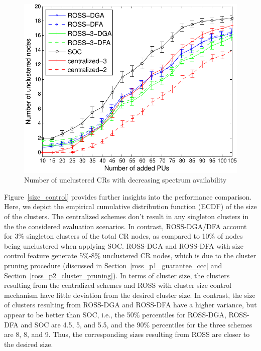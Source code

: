 \documentclass[times]{ettauth}
\theoremstyle{mytheoremstyle}
\theoremstyle{mytheoremstyle}
\theoremstyle{mytheoremstyle}
\begin{document}
\begin{figure}[th]
\begin{multicols}{3}
    \includegraphics[width=\linewidth]{survival_rate_20.pdf}\par\caption{Number of unclustered CRs with decreasing spectrum availability}\label{singleton_clusters}
\end{multicols}
\label{compare_dis_centralized}
\end{figure}

Figure~\ref{size_control} provides further insights into the performance comparison.
Here, we depict the empirical cumulative distribution function (ECDF) of the size of the clusters.
The centralized schemes don't result in any singleton clusters in the the considered evaluation scenarios.
In contrast, ROSS-DGA/DFA account for 3\% singleton clusters of the total CR nodes, as compared to 10\% of nodes being unclustered when applying SOC.
ROSS-DGA and ROSS-DFA with size control feature generate 5\%-8\% unclustered CR nodes, which is due to the cluster pruning procedure (discussed in Section~\ref{ross_p1_guarantee_ccc} and Section~\ref{ross_p2_cluster_pruning}).
In terms of cluster size, the clusters resulting from the centralized schemes and ROSS with cluster size control mechanism have little deviation from the desired cluster size.
In contrast, the size of clusters resulting from ROSS-DGA and ROSS-DFA have a higher variance, but appear to be better than SOC, i.e., the 50\% percentiles for ROSS-DGA, ROSS-DFA and SOC are 4.5, 5, and 5.5, and the 90\% percentiles for the three schemes are 8, 8, and 9.
Thus, the corresponding sizes resulting from ROSS are closer to the desired size.
\end{document}

